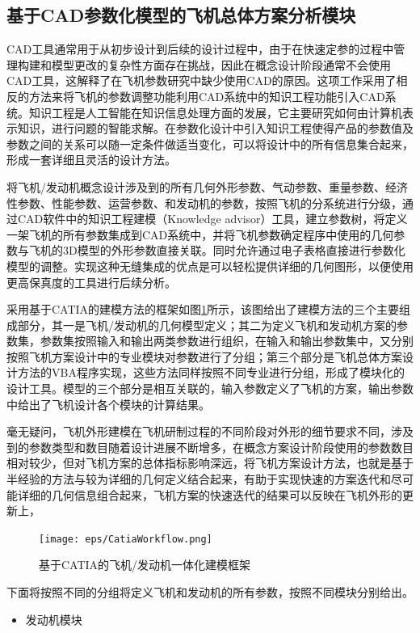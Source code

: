 \documentclass[12pt,a4paper]{report}
\begin{document}
\subsection{基于CAD参数化模型的飞机总体方案分析模块}
CAD工具通常用于从初步设计到后续的设计过程中，由于在快速定参的过程中管理构建和模型更改的复杂性方面存在挑战，因此在概念设计阶段通常不会使用CAD工具，这解释了在飞机参数研究中缺少使用CAD的原因。这项工作采用了相反的方法来将飞机的参数调整功能利用CAD系统中的知识工程功能引入CAD系统。知识工程是人工智能在知识信息处理方面的发展，它主要研究如何由计算机表示知识，进行问题的智能求解。在参数化设计中引入知识工程使得产品的参数值及参数之间的关系可以随一定条件做适当变化，可以将设计中的所有信息集合起来，形成一套详细且灵活的设计方法。

将飞机/发动机概念设计涉及到的所有几何外形参数、气动参数、重量参数、经济性参数、性能参数、运营参数、和发动机的参数，按照飞机的分系统进行分级，通过CAD软件中的知识工程建模（Knowledge advisor）工具，建立参数树，将定义一架飞机的所有参数集成到CAD系统中，并将飞机参数确定程序中使用的几何参数与飞机的3D模型的外形参数直接关联。同时允许通过电子表格直接进行参数化模型的调整。实现这种无缝集成的优点是可以轻松提供详细的几何图形，以便使用更高保真度的工具进行后续分析。

采用基于CATIA的建模方法的框架如图\ref{fig-catiaintegration}所示，该图给出了建模方法的三个主要组成部分，其一是飞机/发动机的几何模型定义；其二为定义飞机和发动机方案的参数集，参数集按照输入和输出两类参数进行组织，在输入和输出参数集中，又分别按照飞机方案设计中的专业模块对参数进行了分组；第三个部分是飞机总体方案设计方法的VBA程序实现，这些方法同样按照不同专业进行分组，形成了模块化的设计工具。模型的三个部分是相互关联的，输入参数定义了飞机的方案，输出参数中给出了飞机设计各个模块的计算结果。

毫无疑问，飞机外形建模在飞机研制过程的不同阶段对外形的细节要求不同，涉及到的参数类型和数目随着设计进展不断增多，在概念方案设计阶段使用的参数数目相对较少，但对飞机方案的总体指标影响深远，将飞机方案设计方法，也就是基于半经验的方法与较为详细的几何定义结合起来，有助于实现快速的方案迭代和尽可能详细的几何信息组合起来，飞机方案的快速迭代的结果可以反映在飞机外形的更新上，
\begin{figure}[htp]
    \centering
   \texttt{[image: eps/CatiaWorkflow.png]}
    \caption{基于CATIA的飞机/发动机一体化建模框架}
    \label{fig-catiaintegration}
\end{figure}

下面将按照不同的分组将定义飞机和发动机的所有参数，按照不同模块分别给出。
\begin{itemize}
    \item[(1)] 发动机模块
\end{itemize}
\end{document}
